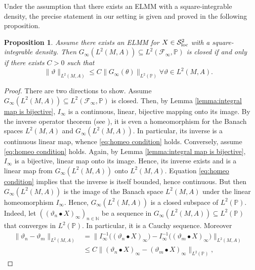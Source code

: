 \documentclass[11pt,a4paper,twoside,openany]{report}
\numberwithin{equation}{section}
\theoremstyle{plain} %
\newtheorem{proposition}[theorem]{Proposition}
\theoremstyle{definition} %
\theoremstyle{remark} %
\let\parencite\authnumparencite
\begin{document}
Under the assumption that there exists an ELMM with a square-integrable density, the precise statement in our setting is given and proved in the following proposition.
\begin{proposition}\label{prop:closedness of G_T in L^2 functional analytic iff condition}
Assume there exists an ELMM for \(X\in\mathcal{S}^2_{\rm{loc}}\) with a square-integrable density. Then
 \(G_{\infty}(L^2(M,A))\subseteq 
L^2(\mathcal{F}_{\infty},\mathbb{P})\) is closed if and only if there exists \(C>0\) such that 
\begin{equation}\label{eq:homeo condition}
    \lVert \vartheta\rVert_{L^2(M,A)}\leq C\lVert G_{\infty}(\theta)\rVert_{L^2(\mathbb{P})}\forall\vartheta\in L^2(M,A).
\end{equation}
\end{proposition}
\begin{proof}
    There are two directions to show. Assume  \(G_{\infty}(L^2(M,A))\subseteq 
L^2(\mathcal{F}_{\infty},\mathbb{P})\) is closed. Then, by Lemma \ref{lemma:integral map is bijective}, \(I_{\infty}\) is a continuous, linear, bijective mapping onto its image. By the inverse operator theorem (see \parencite[Cor.3.2,Ch.4]{SteinShakarchi2005RealAnalysis}), it is even a homeomorphism for the Banach spaces \(L^2(M,A)\) and \(G_{\infty}(L^2(M,A))\). In particular, its inverse is a continuous linear map, whence \eqref{eq:homeo condition} holds. Conversely, assume \eqref{eq:homeo condition} holds. Again, by Lemma \ref{lemma:integral map is bijective}, \(I_{\infty}\) is a bijective, linear map onto its image. Hence, its inverse exists and is a linear map from \(G_{\infty}(L^2(M,A))\) onto \(L^2(M,A)\). Equation \eqref{eq:homeo condition} implies that the inverse is itself bounded, hence continuous. But then \(G_{\infty}(L^2(M,A))\) is the image of the Banach space \(L^2(M,A)\) under the linear homeomorphism \(I_{\infty}\). Hence, \(G_{\infty}(L^2(M,A))\) is a closed subspace of \(L^2(\mathbb{P})\). Indeed, let \(((\vartheta_n\bullet X)_{\infty})_{n\in\mathbb{N}}\) be a sequence in \(G_{\infty}(L^2(M,A))\subseteq L^2(\mathbb{P})\) that converges in \(L^2(\mathbb{P})\). In particular, it is a Cauchy sequence. Moreover
   \begin{align*}
       \lVert \vartheta_n-\vartheta_m\rVert_{L^2(M,A)}
       &=\lVert I_{\infty}^{-1}\big((\vartheta_n\bullet X)_{\infty}\big)
       -I_{\infty}^{-1}\big((\vartheta_m\bullet X)_{\infty}\big)\rVert_{L^2(M,A)}\\
       &\leq C\lVert (\vartheta_n\bullet X)_{\infty}
       -(\vartheta_m\bullet X)_{\infty}\rVert_{L^2(\mathbb{P})},

\end{align*}
\end{proof}
\end{document}

